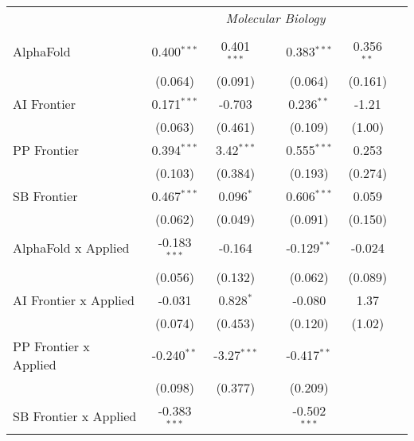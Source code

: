 \begin{tabular}{lcccccc}
 & \multicolumn{6}{c}{\textit{Molecular Biology}} \\ \\
   AlphaFold                      & 0.400$^{***}$  & 0.401$^{***}$ &                & 0.383$^{***}$  & 0.356$^{**}$ &   \\   
                                  & (0.064)        & (0.091)       &                & (0.064)        & (0.161)      &   \\   
   AI Frontier                    & 0.171$^{***}$  & -0.703        &                & 0.236$^{**}$   & -1.21        &   \\   
                                  & (0.063)        & (0.461)       &                & (0.109)        & (1.00)       &   \\   
   PP Frontier                    & 0.394$^{***}$  & 3.42$^{***}$  &                & 0.555$^{***}$  & 0.253        &   \\   
                                  & (0.103)        & (0.384)       &                & (0.193)        & (0.274)      &   \\   
   SB Frontier                    & 0.467$^{***}$  & 0.096$^{*}$   &                & 0.606$^{***}$  & 0.059        &   \\   
                                  & (0.062)        & (0.049)       &                & (0.091)        & (0.150)      &   \\   
   AlphaFold x Applied            & -0.183$^{***}$ & -0.164        &                & -0.129$^{**}$  & -0.024       &   \\   
                                  & (0.056)        & (0.132)       &                & (0.062)        & (0.089)      &   \\   
   AI Frontier x Applied          & -0.031         & 0.828$^{*}$   &                & -0.080         & 1.37         &   \\   
                                  & (0.074)        & (0.453)       &                & (0.120)        & (1.02)       &   \\   
   PP Frontier x Applied          & -0.240$^{**}$  & -3.27$^{***}$ &                & -0.417$^{**}$  &              &   \\   
                                  & (0.098)        & (0.377)       &                & (0.209)        &              &   \\   
   SB Frontier x Applied          & -0.383$^{***}$ &               &                & -0.502$^{***}$ &              &   \\   

\end{tabular}

